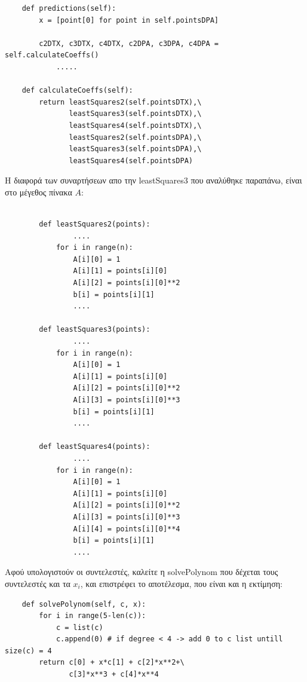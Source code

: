 \documentclass[a4paper,11pt]{article}
\newcommand{\lt}{\latintext}
\newcommand{\gt}{\greektext}
\begin{document}
{    \lt
    \begin{verbatim}
    def predictions(self):
        x = [point[0] for point in self.pointsDPA]

        c2DTX, c3DTX, c4DTX, c2DPA, c3DPA, c4DPA = self.calculateCoeffs() 
            .....
            
    def calculateCoeffs(self):
        return leastSquares2(self.pointsDTX),\
               leastSquares3(self.pointsDTX),\
               leastSquares4(self.pointsDTX),\
               leastSquares2(self.pointsDPA),\
               leastSquares3(self.pointsDPA),\
               leastSquares4(self.pointsDPA)
    \end{verbatim}
    \gt
    \newpage
Η διαφορά των συναρτήσεων απο την {\lt leastSquares3} που αναλύθηκε παραπάνω, είναι στο μέγεθος πίνακα $A$:

    \lt
    \begin{verbatim}
    
        def leastSquares2(points):
                ....
            for i in range(n):
                A[i][0] = 1
                A[i][1] = points[i][0]
                A[i][2] = points[i][0]**2
                b[i] = points[i][1]
                ....
            
        def leastSquares3(points):
                ....
            for i in range(n):
                A[i][0] = 1
                A[i][1] = points[i][0]
                A[i][2] = points[i][0]**2
                A[i][3] = points[i][0]**3
                b[i] = points[i][1]
                ....
    
        def leastSquares4(points):
                ....
            for i in range(n):
                A[i][0] = 1
                A[i][1] = points[i][0]
                A[i][2] = points[i][0]**2
                A[i][3] = points[i][0]**3
                A[i][4] = points[i][0]**4
                b[i] = points[i][1]
                ....
    \end{verbatim}
    \gt
Αφού υπολογιστούν οι συντελεστές, καλείτε η {\lt solvePolynom} που δέχεται τους συντελεστές και τα $x_i$, και επιστρέφει το αποτέλεσμα, που είναι και η εκτίμηση: 
 
    \lt
    \begin{verbatim}
    def solvePolynom(self, c, x):
        for i in range(5-len(c)):
            c = list(c)
            c.append(0) # if degree < 4 -> add 0 to c list untill size(c) = 4
        return c[0] + x*c[1] + c[2]*x**2+\
               c[3]*x**3 + c[4]*x**4


\end{verbatim}}
\end{document}
